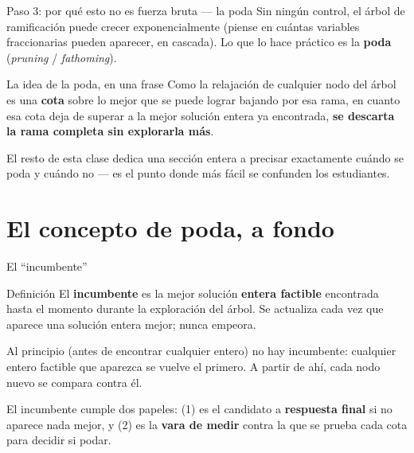 \documentclass[aspectratio=169]{beamer}
\begin{document}
\begin{frame}{Paso 3: por qué esto no es fuerza bruta --- la poda}
Sin ningún control, el árbol de ramificación puede crecer exponencialmente (piense en cuántas variables fraccionarias pueden aparecer, en cascada). Lo que lo hace práctico es la \textbf{poda} (\emph{pruning} / \emph{fathoming}).

\begin{alertblock}{La idea de la poda, en una frase}
Como la relajación de cualquier nodo del árbol es una \textbf{cota} sobre lo mejor que se puede lograr bajando por esa rama, en cuanto esa cota deja de superar a la mejor solución entera ya encontrada, \textbf{se descarta la rama completa sin explorarla más}.
\end{alertblock}

El resto de esta clase dedica una sección entera a precisar exactamente cuándo se poda y cuándo no --- es el punto donde más fácil se confunden los estudiantes.
\end{frame}

\section{El concepto de poda, a fondo}

\begin{frame}{El ``incumbente''}
\begin{block}{Definición}
El \textbf{incumbente} es la mejor solución \textbf{entera factible} encontrada hasta el momento durante la exploración del árbol. Se actualiza cada vez que aparece una solución entera mejor; nunca empeora.
\end{block}

Al principio (antes de encontrar cualquier entero) no hay incumbente: cualquier entero factible que aparezca se vuelve el primero. A partir de ahí, cada nodo nuevo se compara contra él.

\vspace{0.3cm}
El incumbente cumple dos papeles: (1) es el candidato a \textbf{respuesta final} si no aparece nada mejor, y (2) es la \textbf{vara de medir} contra la que se prueba cada cota para decidir si podar.
\end{frame}
\end{document}
